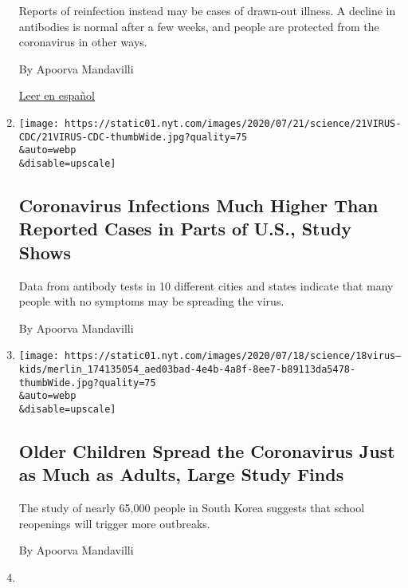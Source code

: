 \begin{enumerate}
  Reports of reinfection instead may be cases of drawn-out illness. A
  decline in antibodies is normal after a few weeks, and people are
  protected from the coronavirus in other ways.

  By Apoorva Mandavilli

  \href{https://www.nytimes.com/es/2020/07/24/espanol/ciencia-y-tecnologia/reinfeccion-coronavirus.html}{Leer
  en español}
\item
  \href{/2020/07/21/health/coronavirus-infections-us.html}{}

  \texttt{[image: https://static01.nyt.com/images/2020/07/21/science/21VIRUS-CDC/21VIRUS-CDC-thumbWide.jpg?quality=75\\\&auto=webp\\\&disable=upscale]}

  \hypertarget{coronavirus-infections-much-higher-than-reported-cases-in-parts-of-us-study-shows}{%
  \subsection{Coronavirus Infections Much Higher Than Reported Cases in
  Parts of U.S., Study
  Shows}\label{coronavirus-infections-much-higher-than-reported-cases-in-parts-of-us-study-shows}}

  Data from antibody tests in 10 different cities and states indicate
  that many people with no symptoms may be spreading the virus.

  By Apoorva Mandavilli
\item
  \href{/2020/07/18/health/coronavirus-children-schools.html}{}

  \texttt{[image: https://static01.nyt.com/images/2020/07/18/science/18virus--kids/merlin\_174135054\_aed03bad-4e4b-4a8f-8ee7-b89113da5478-thumbWide.jpg?quality=75\\\&auto=webp\\\&disable=upscale]}

  \hypertarget{older-children-spread-the-coronavirus-just-as-much-as-adults-large-study-finds}{%
  \subsection{Older Children Spread the Coronavirus Just as Much as
  Adults, Large Study
  Finds}\label{older-children-spread-the-coronavirus-just-as-much-as-adults-large-study-finds}}

  The study of nearly 65,000 people in South Korea suggests that school
  reopenings will trigger more outbreaks.

  By Apoorva Mandavilli
\item
  \href{/2020/07/15/health/coronavirus-schools-reopening.html}{}


\end{enumerate}
